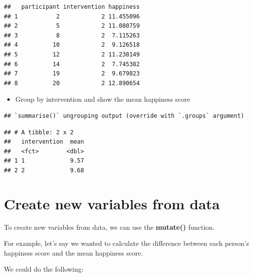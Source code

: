 \documentclass[
]{book}
\newenvironment{Shaded}{\begin{snugshade}}{\end{snugshade}}
\newcommand{\DataTypeTok}[1]{\textcolor[rgb]{0.13,0.29,0.53}{#1}}
\newcommand{\KeywordTok}[1]{\textcolor[rgb]{0.13,0.29,0.53}{\textbf{#1}}}
\newcommand{\NormalTok}[1]{#1}
\newcommand{\OperatorTok}[1]{\textcolor[rgb]{0.81,0.36,0.00}{\textbf{#1}}}
\newcommand{\StringTok}[1]{\textcolor[rgb]{0.31,0.60,0.02}{#1}}
\providecommand{\tightlist}{%
  \setlength{\itemsep}{0pt}\setlength{\parskip}{0pt}}
\begin{document}
\begin{verbatim}
##   participant intervention happiness
## 1           2            2 11.455096
## 2           5            2 11.080759
## 3           8            2  7.115263
## 4          10            2  9.126518
## 5          12            2 11.238149
## 6          14            2  7.745382
## 7          19            2  9.679823
## 8          20            2 12.890654
\end{verbatim}

\begin{itemize}
\tightlist
\item
  Group by intervention and show the mean happiness score
\end{itemize}

\begin{Shaded}
\end{Shaded}

\begin{verbatim}
## `summarise()` ungrouping output (override with `.groups` argument)
\end{verbatim}

\begin{verbatim}
## # A tibble: 2 x 2
##   intervention  mean
##   <fct>        <dbl>
## 1 1             9.57
## 2 2             9.68
\end{verbatim}

\hypertarget{create-new-variables-from-data}{%
\section{Create new variables from data}\label{create-new-variables-from-data}}

To create new variables from data, we can use the \textbf{mutate()} function.

For example, let's say we wanted to calculate the difference between each person's happiness score and the mean happiness score.

We could do the following:

\begin{Shaded}
\end{Shaded}
\end{document}
